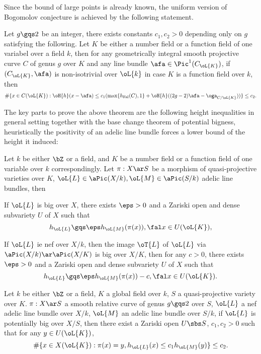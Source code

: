 \documentclass[article, a4paper, twoside]{universal}
\begin{document}
Since the bound of large points is already known, the uniform version of Bogomolov conjecture is achieved by the following statement.
\begin{thm}
	Let $g\gqs2$ be an integer, there exists constants $c_{1},c_{2}>0$ depending only on $g$ satisfying the following. Let $K$ be either a number field or a function field of one variabel over a field $k$, then for any geometrically integral smooth projective curve $C$ of genus $g$ over $K$ and any line bundle $\afa\in\Pic^{1}(C_{\oL{K}})$, if $(C_{\oL{K}},\afa)$ is non-isotrivial over $\oL{k}$ in case $K$ is a function field over $k$, then
	\[
		\#\{x\in C(\oL{K}):\oH{h}(x-\afa)\leq c_{1}(\max\{h_{\mathrm{Fal}}(C),1\}+\oH{h}((2g-2)\afa-\oga_{C/\oL{K}}))\}\leq c_{2}.
	\]
\end{thm}


The key parts to prove the above theorem are the following height inequalities in general setting together with the base change theorem of potential bigness, heuristically the positivity of an adelic line bundle forces a lower bound of the height it induced:
\begin{thm}[{\cite[Theorem~5.3.5]{YZ2021}}]
	Let $k$ be either $\bZ$ or a field, and $K$ be a number field or a function field of one variable over $k$ correspondingly. Let $\pi:X\ar S$ be a morphism of quasi-projective varieties over $K$, $\oL{L}\in\aPic(X/k),\oL{M}\in\aPic(S/k)$ adelic line bundles, then
	\begin{enr}
		\item If $\oL{L}$ is big over $X$, there exists $\eps>0$ and a Zariski open and dense subvariety $U$ of $X$ such that
		\[
			h_{\oL{L}}\gqs\eps h_{\oL{M}}(\pi(x)), \fal x\in U(\oL{K}),
		\]
		\item If $\oL{L}$ ie nef over $X/k$, then the image $\oT{L}$ of $\oL{L}$ via $\aPic(X/k)\ar\aPic(X/K)$ is big over $X/K$, then for any $c>0$, there exists $\eps>0$ and a Zariski open and dense subvariety $U$ of $X$ such that
		\[
			h_{\oL{L}}\gqs\eps h_{\oL{M}}(\pi(x))-c, \fal x\in U(\oL{K}).
		\]
	\end{enr}
\end{thm}

\begin{thm}
	Let $k$ be either $\bZ$ or a field, $K$ a global field over $k$, $S$ a quasi-projective variety over $K$. $\pi:X\ar S$ a smooth relative curve of genus $g\gqs2$ over $S$, $\oL{L}$ a nef adelic line bundle over $X/k$, $\oL{M}$ an adelic line bundle over $S/k$, if $\oL{L}$ is potentially big over $X/S$, then there exist a Zariski open $U\sbs S$, $c_{1},c_{2}>0$ such that for any $y\in U(\oL{K})$,
	\[
		\#\{x\in X(\oL{K}):\pi(x)=y, h_{\oL{L}}(x)\leq c_{1}h_{\oL{M}}(y)\}\leq c_{2}.
	\]
\end{thm}
\end{document}
